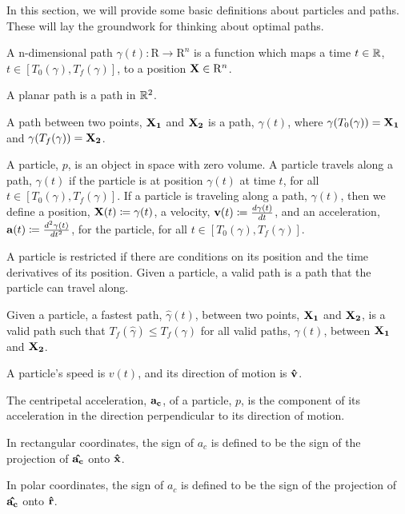 In this section, we will provide some basic definitions about particles and paths. These will lay the groundwork for thinking about optimal paths.

\begin{definition}
  A n-dimensional path $\gamma(t): \mathrm{R} \to \mathrm{R}^n$ is a function which maps a time $t \in \mathbb R$, $t \in [T_0(\gamma), T_f(\gamma)]$, to a position $\mathbf{X} \in \mathrm{R}^n$. 
\end{definition}

\begin{definition}
  A planar path is a path in $\mathbb R^2$.
\end{definition}

\begin{definition}
  A path between two points, $\mathbf{X_1}$ and $\mathbf{X_2}$ is a path, $\gamma(t)$, where $\gamma(T_0(\gamma)) = \mathbf{X_1}$ and $\gamma(T_f(\gamma)) = \mathbf{X_2}$.
\end{definition}

\begin{definition}
  A particle, $p$, is an object in space with zero volume. A particle travels along a path, $\gamma(t)$ if the particle is at position $\gamma(t)$ at time $t$, for all $t \in [T_0(\gamma), T_f(\gamma)]$. If a particle is traveling along a path, $\gamma(t)$, then we define a position, $\mathbf{X}(t) \coloneqq \gamma(t)$, a velocity, $\mathbf{v}(t) \coloneqq \frac{d\gamma(t)}{dt}$, and an acceleration, $\mathbf{a}(t) \coloneqq \frac{d^2\gamma(t)}{dt^2}$, for the particle, for all $t \in [T_0(\gamma), T_f(\gamma)]$.

  A particle is restricted if there are conditions on its position and the time derivatives of its position. Given a particle, a valid path is a path that the particle can travel along.
\end{definition}

\begin{definition}
  Given a particle, a fastest path, $\hat{\gamma}(t)$, between two points, $\mathbf{X_1}$ and $\mathbf{X_2}$, is a valid path such that $T_f(\hat{\gamma}) \leq T_f(\gamma)$ for all valid paths, $\gamma(t)$, between $\mathbf{X_1}$ and $\mathbf{X_2}$.
\end{definition}

\begin{definition}
  A particle's speed is $v(t)$, and its direction of motion is $\mathbf{\hat{v}}$.
\end{definition}

\begin{definition}
  The centripetal acceleration, $\mathbf{a_c}$, of a particle, $p$, is the component of its acceleration in the direction perpendicular to its direction of motion.

  In rectangular coordinates, the sign of $a_c$ is defined to be the sign of the projection of $\mathbf{\hat{a_c}}$ onto $\mathbf{\hat{x}}$. 

  In polar coordinates, the sign of $a_c$ is defined to be the sign of the projection of $\mathbf{\hat{a_c}}$ onto $\mathbf{\hat{r}}$.
\end{definition}

